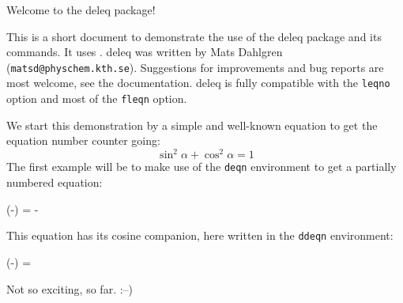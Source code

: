 \documentclass[11pt]{article} %
\begin{document}
  \begin{center}
  \Large Welcome to the \textsf{deleq} package!
  \end{center}

  This is a short document to demonstrate the use of the
  \textsf{deleq} package and its commands.  It uses \deleqver .
  \textsf{deleq} was written by Mats Dahlgren
  (\texttt{matsd@physchem.kth.se}).  Suggestions for
  improvements and bug reports are most welcome, see the
  documentation.  \textsf{deleq} is fully compatible with the
  \texttt{leqno} option and most of the \texttt{fleqn} option.

  We start this demonstration by a simple and well-known
  equation to get the equation number counter going:
  \begin{equation}
    \sin^2\alpha + \cos^2\alpha = 1
  \end{equation}
  The first example will be to make use of the
  \texttt{deqn} environment to get a partially numbered
  equation:
  \begin{deqn}
    \sin (-\alpha) = - \sin \alpha
  \end{deqn}
  This equation has its cosine companion, here written in
  the \texttt{ddeqn} environment:
  \begin{ddeqn}
    \cos (-\alpha) = \cos \alpha
  \end{ddeqn}
  Not so exciting, so far. :--)
\end{document}

